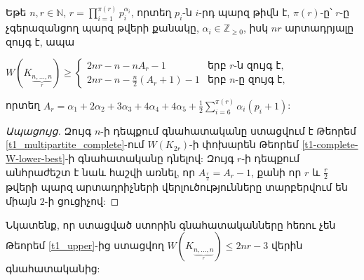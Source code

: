 \begin{corollary}
Եթե $n,r\in \mathbb{N}$, $r=\prod\limits_{i=1}^{\pi(r)}{p_i^{\alpha_i}}$, որտեղ $p_i$-ն $i$-րդ պարզ թիվն է, $\pi(r)$-ը՝ $r$-ը չգերազանցող պարզ թվերի քանակը, $\alpha_i \in \mathbb{Z}_{\geq 0}$, իսկ $nr$ արտադրյալը զույգ է, ապա
\begin{center}
$W\left(K_{\underbrace{\scriptstyle n,\ldots,n}_{r}}\right) \geq 
\left\{\begin{matrix}
 2nr - n - nA_r - 1 & \text{երբ }r\text{-ն զույգ է,} \\ 
 2nr - n - \frac{n}{2}\left(A_r+1\right) - 1 &  \text{երբ }n\text{-ը զույգ է,} 
\end{matrix}\right.$
\end{center}
որտեղ $A_r = \alpha_1 + 2\alpha_2 + 3\alpha_3 + 4\alpha_4 + 4\alpha_5 + \frac{1}{2}\sum\limits_{i=6}^{\pi(r)}{\alpha_i(p_i+1)}$:
\end{corollary}
\begin{proof}[Ապացույց]
Զույգ $n$-ի դեպքում գնահատականը ստացվում է Թեորեմ \ref{t1_multipartite_complete}-ում $W(K_{2r})$-ի փոխարեն Թեորեմ \ref{t1-complete-W-lower-best}-ի գնահատականը դնելով: Զույգ $r$-ի դեպքում անհրաժեշտ է նաև հաշվի առնել, որ $A_{\frac{r}{2}} = A_r - 1$, քանի որ $r$ և $\frac{r}{2}$ թվերի պարզ արտադրիչների վերլուծությունները տարբերվում են միայն $2$-ի ցուցիչով:
\end{proof}

Նկատենք, որ ստացված ստորին գնահատականները հեռու չեն Թեորեմ \ref{t1_upper}-ից ստացվող $W\left(K_{\underbrace{\scriptstyle n,\ldots,n}_{r}}\right) \leq 2nr - 3$ վերին գնահատականից: